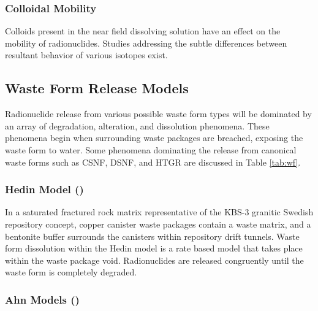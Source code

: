 


\subsubsection{Colloidal Mobility}

Colloids present in the near field dissolving solution have an effect on the
mobility of radionuclides. Studies addressing the subtle differences between 
resultant behavior of various isotopes exist.

\subsection{Waste Form Release Models}

Radionuclide release from various possible waste form types will be dominated by an 
array of degradation, alteration, and dissolution phenomena. These phenomena 
begin when surrounding waste packages are breached, exposing the waste form to 
water. Some phenomena dominating the release from canonical waste forms such as  
\gls{CSNF}, \gls{DSNF}, and \gls{HTGR} are discussed in Table \ref{tab:wf}.








\subsubsection{Hedin Model (\cite{hedin_integrated_2002})}

In a saturated fractured rock matrix representative of the KBS-3 granitic
Swedish repository concept, copper canister waste packages contain a waste
matrix, and a bentonite buffer surrounds the canisters within repository drift
tunnels. Waste form dissolution within the Hedin model is a rate based model
that takes place within the waste package void. Radionuclides are released
congruently until the waste form is completely degraded.
\cite{hedin_integrated_2002} 

\subsubsection{Ahn Models (\cite{ahn_environmental_2004,
ahn_environmental_2007})}

